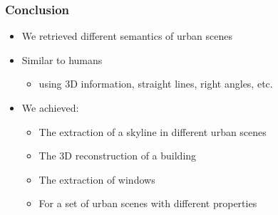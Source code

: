 \documentclass{beamer}
\begin{document}
\frame
{
	\frametitle{Conclusion}		

	\begin{itemize}
	\item <+-| alert@+> We retrieved different semantics of urban scenes
	\item <+-| alert@+> Similar to humans 
		\begin{itemize}
		\item <+-| alert@+> using 3D information, straight lines, right angles, etc.
		\end{itemize}
	\item <+-| alert@+> We achieved:
		\begin{itemize}
		\item <+-| alert@+> The extraction of a skyline in different urban scenes
		\item <+-| alert@+> The 3D reconstruction of a building
		\item <+-| alert@+> The extraction of windows
		\item <+-| alert@+> For a set of urban scenes with different properties 
		\end{itemize}
	\end{itemize}
}
\end{document}
